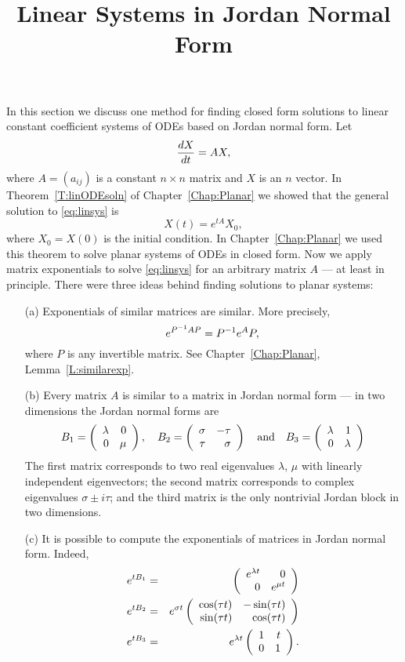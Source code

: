 \documentclass{ximera}
\title{Linear Systems in Jordan Normal Form}
\begin{document}
\begin{abstract}
\end{abstract}
\maketitle


\label{sec:LinHomSys}

In this section we discuss one method for finding 
closed form solutions to 
linear constant coefficient systems of ODEs based on 
Jordan normal form. Let  
\begin{equation}  \label{eq:linsys}
\displaystyle\frac{dX}{dt} = AX,
\end{equation}
where $A=(a_{ij})$ is a constant $n\times n$ matrix and $X$ is an 
$n$ vector.  In Theorem~\ref{T:linODEsoln} of Chapter~\ref{Chap:Planar} 
we showed that the general solution to 
\eqref{eq:linsys} is
\[
X(t) = e^{tA}X_0,
\]
where $X_0=X(0)$ is the initial condition.  
In Chapter~\ref{Chap:Planar} 
we used this theorem to solve planar systems of ODEs in closed form.
Now we apply matrix exponentials to solve \eqref{eq:linsys} for an 
arbitrary matrix $A$ --- at least in principle.
There were three ideas behind finding solutions to planar systems:
\begin{itemize}
\item[(a)] Exponentials of similar 
matrices are similar.  More precisely,
\[
e^{P^{-1} AP} = P^{-1} e^{A}P,
\]
where $P$ is any invertible matrix.  
See Chapter~\ref{Chap:Planar}, Lemma~\ref{L:similarexp}.
\item[(b)]	Every matrix $A$ is similar to a matrix in Jordan normal 
form --- in two dimensions the Jordan normal forms are
\[
B_1=\left(\begin{array}{rr} \lambda & 0\\ 0 &\mu\end{array}\right), \quad B_2=\left(\begin{array}{rr} \sigma & -\tau\\ \tau &\sigma\end{array}\right)
\quad\mbox{and}\quad B_3=\left(\begin{array}{rr} \lambda & 1\\ 0 &\lambda\end{array}\right)
\]
The first matrix corresponds to two 
real eigenvalues $\lambda$, $\mu$
with linearly independent eigenvectors; the second matrix 
corresponds to complex eigenvalues 
$\sigma\pm i\tau$; and the third matrix is the only nontrivial 
Jordan block in two dimensions.
\item[(c)]	It is possible to compute the exponentials of matrices in
Jordan normal form.  Indeed,
\begin{eqnarray*}
e^{tB_1} &  = & \left(\begin{array}{rr} e^{\lambda t} & 0\\ 0 &e^{\mu t}\end{array}\right) \\
e^{tB_2} & = & 
e^{\sigma t}\left(\begin{array}{rr} \cos(\tau t) & -\sin(\tau t)\\ \sin(\tau t) &\cos(\tau t)\end{array}\right) \\
e^{tB_3} & = &  e^{\lambda t}\left(\begin{array}{rr} 1 & t\\ 0 &1\end{array}\right).
\end{eqnarray*}
\end{itemize}
\end{document}
